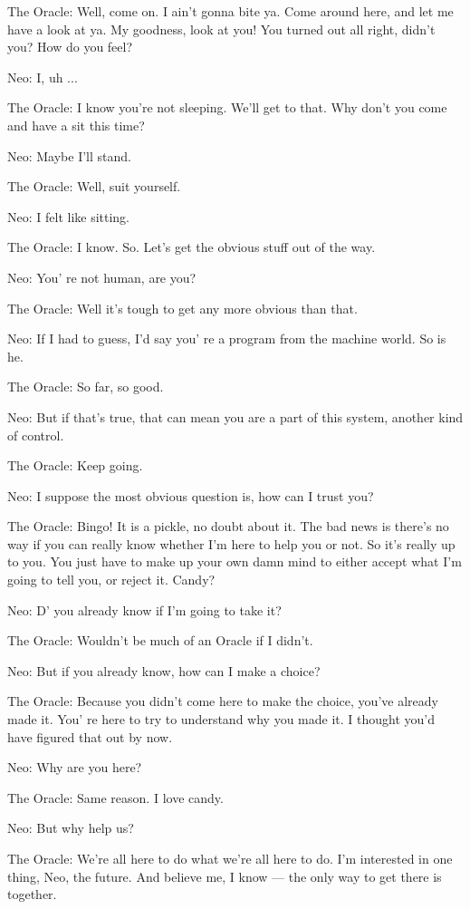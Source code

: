 \documentclass{ctexart}
\newenvironment{myquote}{\color{green} \setlength{\leftskip}{6em} \setlength{\rightskip}{4em} \setlength{\parindent}{-2em}}{\par}
\begin{document}
\begin{myquote}
The Oracle: Well, come on. I ain't gonna bite ya. Come around here, and let me have a look at ya. My goodness, look at you! You turned out all right, didn't you? How do you feel?

Neo: I, uh ...

The Oracle: I know you're not sleeping. We'll get to that. Why don't you come and have a sit this time?

Neo: Maybe I'll stand.

The Oracle: Well, suit yourself.

Neo: I felt like sitting.

The Oracle: I know. So. Let's get the obvious stuff out of the way.

Neo: You' re not human, are you?

The Oracle: Well it's tough to get any more obvious than that.

Neo: If I had to guess, I'd say you' re a program from the machine world. So is he.

The Oracle: So far, so good.

Neo: But if that's true, that can mean you are a part of this system, another kind of control.

The Oracle: Keep going.

Neo: I suppose the most obvious question is, how can I trust you?

The Oracle: Bingo! It is a pickle, no doubt about it. The bad news is there's no way if you can really know whether I'm here to help you or not. So it's really up to you. You just have to make up your own damn mind to either accept what I'm going to tell you, or reject it. Candy?

Neo: D' you already know if I'm going to take it?

The Oracle: Wouldn't be much of an Oracle if I didn't.

Neo: But if you already know, how can I make a choice?

The Oracle: Because you didn't come here to make the choice, you've already made it. You' re here to try to understand why you made it. I thought you'd have figured that out by now.

Neo: Why are you here?

The Oracle: Same reason. I love candy.

Neo: But why help us?

The Oracle: We're all here to do what we're all here to do. I'm interested in one thing, Neo, the future. And believe me, I know --- the only way to get there is together.


\end{myquote}
\end{document}
